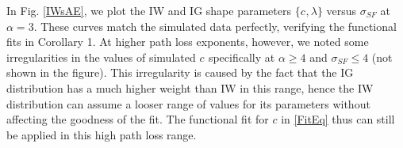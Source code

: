 \documentclass[12pt, draftclsnofoot, onecolumn]{IEEEtran}
\theoremstyle{plain}
\begin{document}
In Fig. \ref{IWsAE}, we plot the IW and IG shape parameters $\{{c_{}},\lambda\}$ versus $\sigma_{SF}$ at %
$\alpha=3$. %
These curves match the simulated data perfectly, verifying the functional fits in Corollary 1. %
At higher path loss exponents, however, we noted some irregularities in the values of simulated ${{c_{}}}$ %
specifically at $\alpha \geq 4$ and $\sigma_{SF} \leq 4$ %
(not shown in the figure).
This irregularity is caused by the fact that the IG distribution has a much higher weight than IW in this range, hence the IW distribution can assume a looser range of values for its parameters without affecting the goodness of the fit. %
The functional fit for $c$ in \eqref{FitEq} thus can still be applied in this high path loss range.
\end{document}

